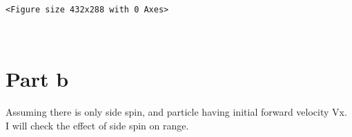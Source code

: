 \documentclass[11pt]{article}
\begin{document}
    
    \begin{verbatim}
<Figure size 432x288 with 0 Axes>
    \end{verbatim}

    
    \begin{center}
    \end{center}
    { \hspace*{\fill} \\}
    
    \hypertarget{part-b}{%
\section{Part b}\label{part-b}}

Assuming there is only side spin, and particle having initial forward
velocity Vx. I will check the effect of side spin on range.
\end{document}
